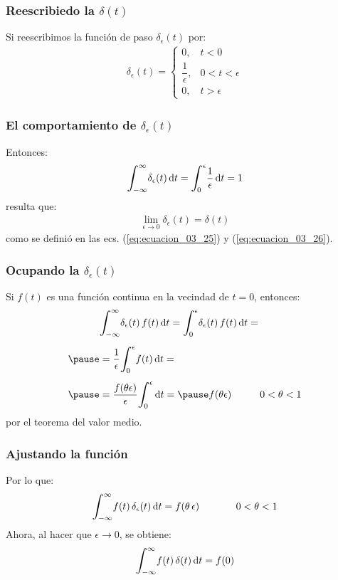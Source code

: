 \documentclass[12pt]{beamer}
\begin{document}
\begin{frame}
\frametitle{Reescribiedo la $\delta (t)$}
Si reescribimos la función de paso $\delta_{\epsilon} (t)$ por:
\pause
\begin{align}
\delta_{\epsilon} (t) = \begin{cases}
0, & t < 0 \\
\dfrac{1}{\epsilon}, & 0 < t < \epsilon \\
0, & t > \epsilon
\end{cases}
\label{eq:ecuacion_03_27}
\end{align}
\end{frame}
\begin{frame}
\frametitle{El comportamiento de $\delta_{\epsilon} (t)$}
Entonces:
\pause
\begin{align}
\scaleint{6ex}_{\bs - \infty}^{\infty} \delta_{\epsilon} (t) \dd{t} = \scaleint{6ex}_{\bs 0}^{\epsilon} \dfrac{1}{\epsilon} \dd{t} = 1
\label{eq:ecuacion_03_28}
\end{align}
\pause
resulta que:
\pause
\begin{align}
\lim_{\epsilon \to 0} \delta_{\epsilon} (t) = \delta (t)
\label{eq:ecuacion_03_29}
\end{align}
como se definió en las ecs. (\ref{eq:ecuacion_03_25}) y (\ref{eq:ecuacion_03_26}).
\end{frame}
\begin{frame}
\frametitle{Ocupando la $\delta_{\epsilon} (t)$}
Si $f(t)$ es una función continua en la vecindad de $t = 0$, entonces:
\pause
\begin{eqnarray*}
\begin{aligned}
&\scaleint{6ex}_{\bs - \infty}^{\infty} \delta_{\epsilon} (t) \, f(t) \dd{t} = \scaleint{6ex}_{\bs 0}^{\epsilon} \delta_{\epsilon} (t) \, f(t) \dd{t} = \\[0.5em] \pause
&=\dfrac{1}{\epsilon} \scaleint{6ex}_{\bs 0}^{\epsilon} f(t) \dd{t} = \\[0.5em] \pause
&= \dfrac{f(\theta \epsilon)}{\epsilon} \scaleint{6ex}_{\bs 0}^{\epsilon} \dd{t} = \pause f (\theta \epsilon) \hspace{1cm} 0 < \theta < 1
\end{aligned}
\end{eqnarray*}
por el teorema del valor medio.
\end{frame}
\begin{frame}
\frametitle{Ajustando la función}
Por lo que:
\pause
\begin{align*}
\scaleint{6ex}_{\bs - \infty}^{\infty} f(t) \, \delta_{\epsilon} (t) \dd{t} = f (\theta \, \epsilon) \hspace{1.3cm} 0 < \theta < 1
\end{align*}
\pause
Ahora, al hacer que $\epsilon \to 0$, se obtiene:
\begin{align}
\scaleint{6ex}_{\bs - \infty}^{\infty} f(t) \, \delta (t) \dd{t} = f (0)
\label{eq:ecuacion_03_30}
\end{align}
\end{frame}
\end{document}
